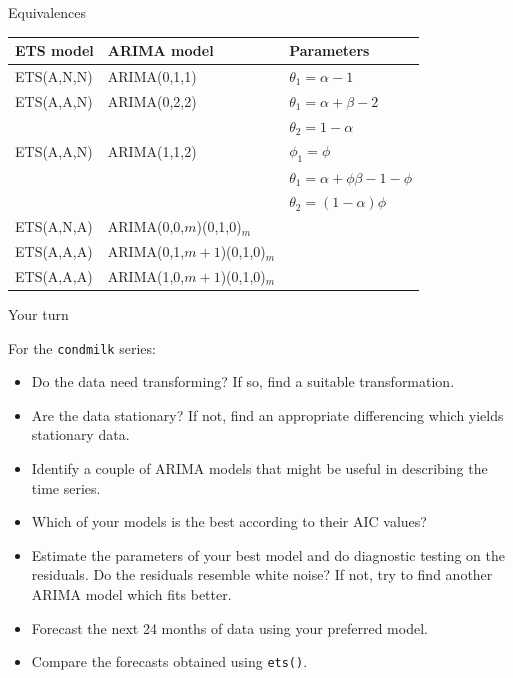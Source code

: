 \documentclass[14pt,ignorenonframetext,]{beamer}
\providecommand{\tightlist}{%
  \setlength{\itemsep}{0pt}\setlength{\parskip}{0pt}}
\begin{document}
\begin{frame}{Equivalences}

\fontsize{12}{14}\sf

\begin{longtable}[]{@{}lll@{}}
\toprule
\textbf{ETS model} & \textbf{ARIMA model} &
\textbf{Parameters}\tabularnewline
\midrule
\endhead
ETS(A,N,N) & ARIMA(0,1,1) & \(\theta_1 = \alpha-1\)\tabularnewline
ETS(A,A,N) & ARIMA(0,2,2) & \(\theta_1 = \alpha+\beta-2\)\tabularnewline
& & \(\theta_2 = 1-\alpha\)\tabularnewline
ETS(A,A,N) & ARIMA(1,1,2) & \(\phi_1=\phi\)\tabularnewline
& & \(\theta_1 = \alpha+\phi\beta-1-\phi\)\tabularnewline
& & \(\theta_2 = (1-\alpha)\phi\)\tabularnewline
ETS(A,N,A) & ARIMA(0,0,\(m\))(0,1,0)\(_m\) &\tabularnewline
ETS(A,A,A) & ARIMA(0,1,\(m+1\))(0,1,0)\(_m\) &\tabularnewline
ETS(A,A,A) & ARIMA(1,0,\(m+1\))(0,1,0)\(_m\) &\tabularnewline
\bottomrule
\end{longtable}

\end{frame}

\begin{frame}[fragile]{Your turn}

\fontsize{13}{13}\sf

For the \texttt{condmilk} series:

\begin{itemize}
\tightlist
\item
  Do the data need transforming? If so, find a suitable transformation.
\item
  Are the data stationary? If not, find an appropriate differencing
  which yields stationary data.
\item
  Identify a couple of ARIMA models that might be useful in describing
  the time series.
\item
  Which of your models is the best according to their AIC values?
\item
  Estimate the parameters of your best model and do diagnostic testing
  on the residuals. Do the residuals resemble white noise? If not, try
  to find another ARIMA model which fits better.
\item
  Forecast the next 24 months of data using your preferred model.
\item
  Compare the forecasts obtained using \texttt{ets()}.
\end{itemize}

\end{frame}
\end{document}
